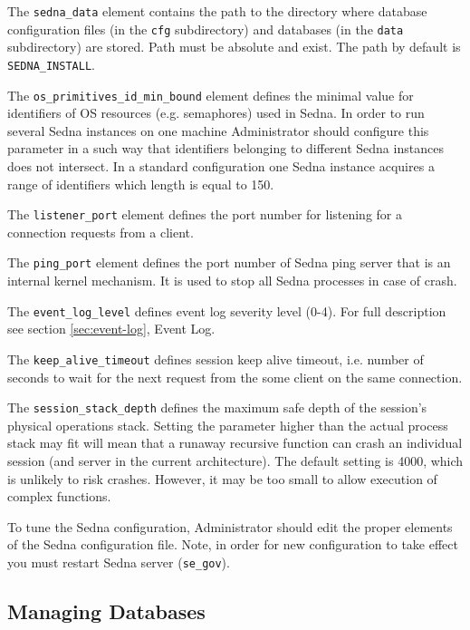 \documentclass[a4paper,12pt]{article}
\begin{document}
The \verb!sedna_data! element contains the path to the directory where database
configuration files (in the \verb!cfg! subdirectory) and databases (in the
\verb!data! subdirectory) are stored. Path must be absolute and exist. The path
by default is \verb!SEDNA_INSTALL!.

The \verb!os_primitives_id_min_bound! element defines the minimal value for
identifiers of OS resources (e.g. semaphores) used in Sedna. In order to run
several Sedna instances on one machine Administrator should configure this
parameter in a such way that identifiers belonging to different Sedna instances
does not intersect. In a standard configuration one Sedna instance acquires a
range of identifiers which length is equal to 150.

The \verb!listener_port! element defines the port number for listening for a
connection requests from a client.

The \verb!ping_port! element defines the port number of Sedna ping server that
is an internal kernel mechanism. It is used to stop all Sedna processes in case
of crash.

The \verb!event_log_level! defines event log severity level (0-4). For full
description see section \ref{sec:event-log}, Event Log.

The \verb!keep_alive_timeout! defines session keep alive timeout, i.e. number of
seconds to wait for the next request from the some client on the same
connection.

The \verb!session_stack_depth! defines the maximum safe depth of the session's
physical operations stack. Setting the parameter higher than the actual process
stack may fit will mean that a runaway recursive function can crash an
individual session (and server in the current architecture). The default setting
is 4000, which is unlikely to risk crashes. However, it may be too small to
allow execution of complex functions.

To tune the Sedna configuration, Administrator should edit the proper elements
of the Sedna configuration file. Note, in order for new configuration to take
effect you must restart Sedna server (\verb!se_gov!).


\subsection{Managing Databases}
\end{document}
